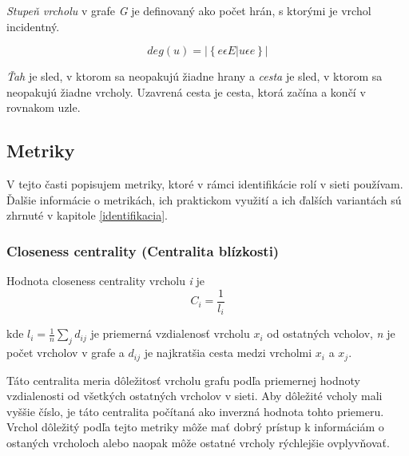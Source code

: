\documentclass[slovak,master,public,dept460,male,cpdeclaration,oneside]{diploma}
\begin{document}
\begin{definition}
\textit{Stupeň vrcholu} v grafe \textit{G} je definovaný ako počet hrán, s ktorými je vrchol incidentný. \cite{kovavr2012uvod}
\end{definition}

\begin{equation}
{deg(u) = \left |\left \{ e  \epsilon E | u \epsilon e   \right \} \right |}
\end{equation}


\begin{definition}
\textit{Ťah} je sled, v ktorom sa neopakujú žiadne hrany a \textit{cesta} je sled, v ktorom sa neopakujú žiadne vrcholy. Uzavrená cesta je cesta, ktorá začína a končí v rovnakom uzle. \cite{kovavr2012uvod}
\end{definition}


\subsection{Metriky}
V tejto časti popisujem metriky, ktoré v rámci identifikácie rolí v sieti používam. Ďalšie informácie o metrikách, ich praktickom využití a ich ďalších variantách sú zhrnuté v kapitole \ref{identifikacia}.

\subsubsection{Closeness centrality (Centralita blízkosti)} \label{kapitola_closeness}
\begin{definition}
Hodnota closeness centrality vrcholu \textit{i} je
\begin{equation}
{C_{i} = \frac{1}{l_{i}}} 
\label{equation_closeness_centrality}
\end{equation}
\end{definition}

kde ${{l_{i} = \frac{1}{n}\sum_{j}d_{ij}}}$ je priemerná vzdialenosť vrcholu ${x_{i}}$ od ostatných vcholov, \textit{n} je počet vrcholov v grafe a ${d_{ij}}$ je najkratšia cesta medzi vrcholmi  ${x_{i}}$ a  ${x_{j}}$. 



Táto centralita meria dôležitosť vrcholu grafu podľa priemernej hodnoty vzdialenosti od všetkých ostatných vrcholov v sieti. Aby dôležité vcholy mali vyššie číslo, je táto centralita počítaná ako inverzná hodnota tohto priemeru. Vrchol dôležitý podľa tejto metriky môže mať dobrý prístup k informáciám o ostaných vrcholoch alebo naopak môže ostatné vrcholy rýchlejšie ovplyvňovať.
\end{document}
